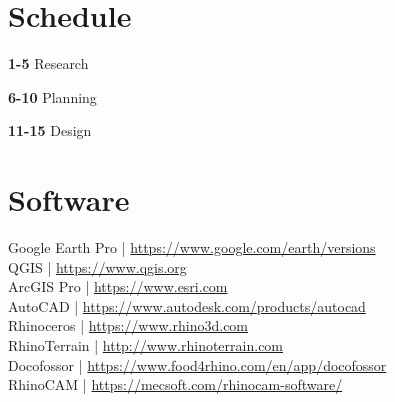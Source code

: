 \documentclass[11pt,article,oneside]{memoir}
\begin{document}

\section{Schedule}


\noindent
\begin{minipage}[t]{0.32\linewidth}
\textbf{1-5} \quad Research
\end{minipage}
\hfill
\begin{minipage}[t]{0.32\linewidth}
\textbf{6-10} \quad Planning
\end{minipage}
\hfill
\begin{minipage}[t]{0.32\linewidth}
\textbf{11-15} \quad Design
\end{minipage}


\section{Software}

Google Earth Pro | \url{https://www.google.com/earth/versions}\\
QGIS | \url{https://www.qgis.org}\\
ArcGIS Pro | \url{https://www.esri.com}\\
AutoCAD | \url{https://www.autodesk.com/products/autocad}\\
Rhinoceros | \url{https://www.rhino3d.com}\\
RhinoTerrain | \url{http://www.rhinoterrain.com}\\
Docofossor | \url{https://www.food4rhino.com/en/app/docofossor}\\
RhinoCAM | \url{https://mecsoft.com/rhinocam-software/}\\
\end{document}
